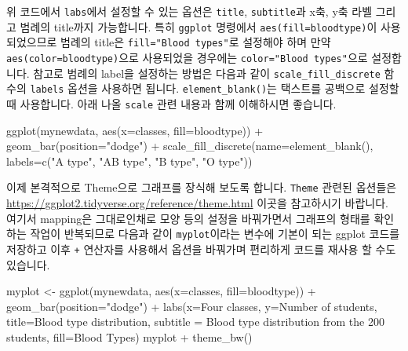 \documentclass[
]{book}
\newenvironment{Shaded}{\begin{snugshade}}{\end{snugshade}}
\newcommand{\AttributeTok}[1]{\textcolor[rgb]{0.77,0.63,0.00}{#1}}
\newcommand{\FunctionTok}[1]{\textcolor[rgb]{0.00,0.00,0.00}{#1}}
\newcommand{\NormalTok}[1]{#1}
\newcommand{\OtherTok}[1]{\textcolor[rgb]{0.56,0.35,0.01}{#1}}
\newcommand{\SpecialCharTok}[1]{\textcolor[rgb]{0.00,0.00,0.00}{#1}}
\newcommand{\StringTok}[1]{\textcolor[rgb]{0.31,0.60,0.02}{#1}}
\begin{document}
위 코드에서 \texttt{labs}에서 설정할 수 있는 옵션은 \texttt{title}, \texttt{subtitle}과 x축, y축 라벨 그리고 범례의 title까지 가능합니다. 특히 \texttt{ggplot} 명령에서 \texttt{aes(fill=bloodtype)}이 사용되었으므로 범례의 title은 \texttt{fill="Blood\ types"}로 설정해야 하며 만약 \texttt{aes(color=bloodtype)}으로 사용되었을 경우에는 \texttt{color="Blood\ types"}으로 설정합니다. 참고로 범례의 label을 설정하는 방법은 다음과 같이 \texttt{scale\_fill\_discrete} 함수의 \texttt{labels} 옵션을 사용하면 됩니다. \texttt{element\_blank()}는 택스트를 공백으로 설정할 때 사용합니다. 아래 나올 \texttt{scale} 관련 내용과 함께 이해하시면 좋습니다.

\begin{Shaded}
\begin{Highlighting}[]
\FunctionTok{ggplot}\NormalTok{(mynewdata, }\FunctionTok{aes}\NormalTok{(}\AttributeTok{x=}\NormalTok{classes, }\AttributeTok{fill=}\NormalTok{bloodtype)) }\SpecialCharTok{+}
  \FunctionTok{geom\_bar}\NormalTok{(}\AttributeTok{position=}\StringTok{"dodge"}\NormalTok{) }\SpecialCharTok{+}
  \FunctionTok{scale\_fill\_discrete}\NormalTok{(}\AttributeTok{name=}\FunctionTok{element\_blank}\NormalTok{(), }\AttributeTok{labels=}\FunctionTok{c}\NormalTok{(}\StringTok{"A type"}\NormalTok{, }\StringTok{"AB type"}\NormalTok{, }\StringTok{"B type"}\NormalTok{, }\StringTok{"O type"}\NormalTok{))}
\end{Highlighting}
\end{Shaded}

이제 본격적으로 Theme으로 그래프를 장식해 보도록 합니다. \texttt{Theme} 관련된 옵션들은 \url{https://ggplot2.tidyverse.org/reference/theme.html} 이곳을 참고하시기 바랍니다. 여기서 mapping은 그대로인채로 모양 등의 설정을 바꿔가면서 그래프의 형태를 확인하는 작업이 반복되므로 다음과 같이 \texttt{myplot}이라는 변수에 기본이 되는 ggplot 코드를 저장하고 이후 \texttt{+} 연산자를 사용해서 옵션을 바꿔가며 편리하게 코드를 재사용 할 수도 있습니다.

\begin{Shaded}
\begin{Highlighting}[]
\NormalTok{myplot }\OtherTok{\textless{}{-}} \FunctionTok{ggplot}\NormalTok{(mynewdata, }\FunctionTok{aes}\NormalTok{(}\AttributeTok{x=}\NormalTok{classes, }\AttributeTok{fill=}\NormalTok{bloodtype)) }\SpecialCharTok{+}
  \FunctionTok{geom\_bar}\NormalTok{(}\AttributeTok{position=}\StringTok{"dodge"}\NormalTok{) }\SpecialCharTok{+}
  \FunctionTok{labs}\NormalTok{(}\AttributeTok{x=}\StringTok{\textquotesingle{}Four classes\textquotesingle{}}\NormalTok{,}
       \AttributeTok{y=}\StringTok{\textquotesingle{}Number of students\textquotesingle{}}\NormalTok{,}
       \AttributeTok{title=}\StringTok{\textquotesingle{}Blood type distribution\textquotesingle{}}\NormalTok{,}
       \AttributeTok{subtitle =} \StringTok{\textquotesingle{}Blood type distribution from the 200 students\textquotesingle{}}\NormalTok{,}
       \AttributeTok{fill=}\StringTok{\textquotesingle{}Blood Types\textquotesingle{}}\NormalTok{) }
\NormalTok{myplot }\SpecialCharTok{+} \FunctionTok{theme\_bw}\NormalTok{()}
\end{Highlighting}
\end{Shaded}
\end{document}
